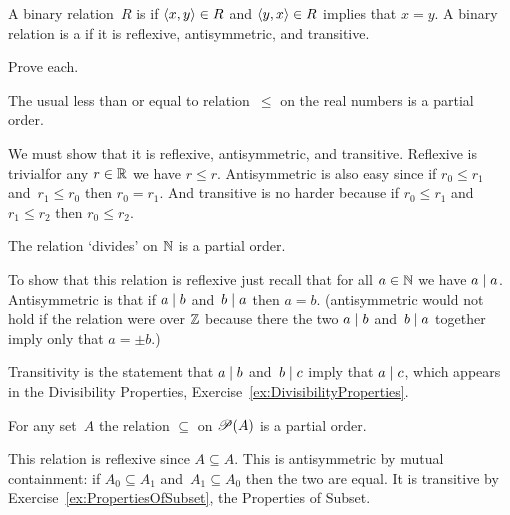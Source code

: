 \documentclass{ibl}  %
\begin{document}
\begin{df}
A binary relation~$R$ is  if
$\langle x,y\rangle\in R$ and $\langle y,x\rangle\in R$ implies that $x=y$.
A binary relation is a  if it is 
reflexive, antisymmetric, and transitive.  
\end{df}

\begin{problem} Prove each.
\begin{exes}
\begin{exercise}[\midlength]
  The usual less than or equal to relation~$\leq$ on 
  the real numbers is a partial order.
\end{exercise}
\begin{answer}
  We must show that it is reflexive, antisymmetric, and transitive.
  Reflexive is trivial\Dash for any $r\in\mathbb{R}$ we have $r\leq r$.
  Antisymmetric is also easy since if $r_0\leq r_1$ and~$r_1\leq r_0$
  then $r_0=r_1$.
  And transitive is no harder because if $r_0\leq r_1$ and~$r_1\leq r_2$
  then $r_0\leq r_2$.  
\end{answer}
\begin{exercise} 
  The relation `divides' on $\mathbb{N}$ is a partial order.
\end{exercise}
\begin{answer}
  To show that 
  this relation is reflexive just recall that for all $a\in\mathbb{N}$ we have
  $a\mid a$.
  Antisymmetric is that if $a\mid b$ and~$b\mid a$ then
  $a=b$.
  (\remark antisymmetric would not hold if the relation were over
  $\mathbb{Z}$ because there the two $a\mid b$ and~$b\mid a$ together imply
  only that $a=\pm b$.)

  Transitivity is the statement that $a\mid b$ and~$b\mid c$ imply
  that $a\mid c$, which appears
  in the Divisibility Properties, Exercise~\ref{ex:DivisibilityProperties}.  
\end{answer}
\begin{exercise} 
  For any set~$A$ the relation $\subseteq$ on $\mathscr{P}(A)$ is
  a partial order.
\end{exercise}
\begin{answer}
  This relation is reflexive since $A\subseteq A$.
  This is antisymmetric by mutual containment: 
  if $A_0\subseteq A_1$ and~$A_1\subseteq A_0$ then the two are equal.
  It is transitive by Exercise~\ref{ex:PropertiesOfSubset}, 
  the Properties of Subset.  
\end{answer}
\end{exes}
\end{problem}
\end{document}
